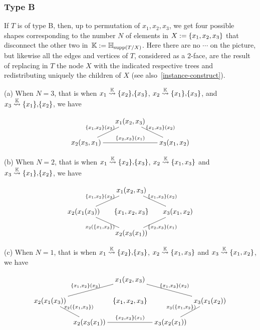 \subsubsection{Type B}
\label{ss:type-B}
If $T$ is of type B, then, up to permutation of $x_1,x_2,x_3$, we get four possible shapes corresponding to the number $N$ of  elements in $X:=\left\{x_1,x_2,x_3\right\}$ that disconnect the other two in~${\mathbb K}:={\mathbb H}_{\operatorname{supp}(T/X)}$.
Here there are no $\cdots$ on the picture, but likewise all the edges and vertices of $T$, considered as a 2-face, are the result of replacing in $T$ the node $X$ with the indicated respective trees and redistributing uniquely the  children of $X$ (see also~\cref{instance-construct}). 
 
\smallskip\noindent
(a)  When $N=3$, that is when $x_1\stackrel{{\mathbb K}}{\rightsquigarrow}\left\{x_2\right\}\!,\! \left\{x_3\right\}$, $x_2\stackrel{{\mathbb K}}{\rightsquigarrow}\left\{x_1\right\}\!,\! \left\{x_3\right\}$, and
 $x_3\stackrel{{\mathbb K}}{\rightsquigarrow}\left\{x_1\right\}\!,\! \left\{x_2\right\}$, we have
 
 $$\xymatrix @-1.65pc {&& x_1(x_2,x_3) \ar @{-}[ddll]_{\set{x_1,x_2}(x_3)} \ar @{-}[ddrr]^{\set{x_1,x_3}(x_2)}&& \\
 &&&&\\
 x_2(x_3,x_1) \ar @{-}[rrrr]^{\set{x_2,x_3}(x_1)} &&&& x_3(x_1,x_2)}$$

\smallskip\noindent
(b) When $N=2$, that is when $x_1\stackrel{{\mathbb K}}{\rightsquigarrow}\left\{x_2\right\}\!,\! \left\{x_3\right\}$, $x_2\stackrel{{\mathbb K}}{\rightsquigarrow}\left\{x_1,x_3\right\}$ and
 $x_3\stackrel{{\mathbb K}}{\rightsquigarrow}\left\{x_1\right\}\!,\! \left\{x_2\right\}$, we have
 
 $$ \xymatrix @-1.65pc {&& x_1(x_2,x_3) \ar @{-}[ddll]_{\set{x_1,x_2}(x_3)} \ar @{-}[ddrr]^{\set{x_1,x_3}(x_2)}&& \\
 &&&&\\
 x_2(x_1(x_3)) \ar @{-}[ddrr]_{x_2(\set{x_1,x_3})}&& \set{x_1,x_2,x_3}  && x_3(x_1,x_2)\ar @{-}[ddll]^{\set{x_2,x_3}(x_1)}\\
 &&&&\\
 &&  x_2(x_3(x_1))&&}$$

\smallskip\noindent
(c) When $N=1$, that is when $x_1\stackrel{{\mathbb K}}{\rightsquigarrow}\left\{x_2\right\}\!,\! \left\{x_3\right\}$, $x_2\stackrel{{\mathbb K}}{\rightsquigarrow}\left\{x_1,x_3\right\}$ and
 $x_3\stackrel{{\mathbb K}}{\rightsquigarrow}\left\{x_1,x_2\right\}$, we have
 
$$
 \xymatrix @-1.65pc {&& x_1(x_2,x_3) \ar @{-}[ddll]_{\set{x_1,x_2}(x_3)} \ar @{-}[ddrr]^{\set{x_1,x_3}(x_2)}&& \\
 &&&&\\
 x_2(x_1(x_3)) \ar @{-}[ddr]^{x_2(\set{x_1,x_3})}&& \set{x_1,x_2,x_3}  && x_3(x_1(x_2))\ar @{-}[ddl]_{x_3(\set{x_1,x_2})}\\
 &&&&\\
 &x_2(x_3(x_1))\ar @{-}[rr]^{\set{x_2,x_3}(x_1)}&  & x_3(x_2(x_1))&}
$$

